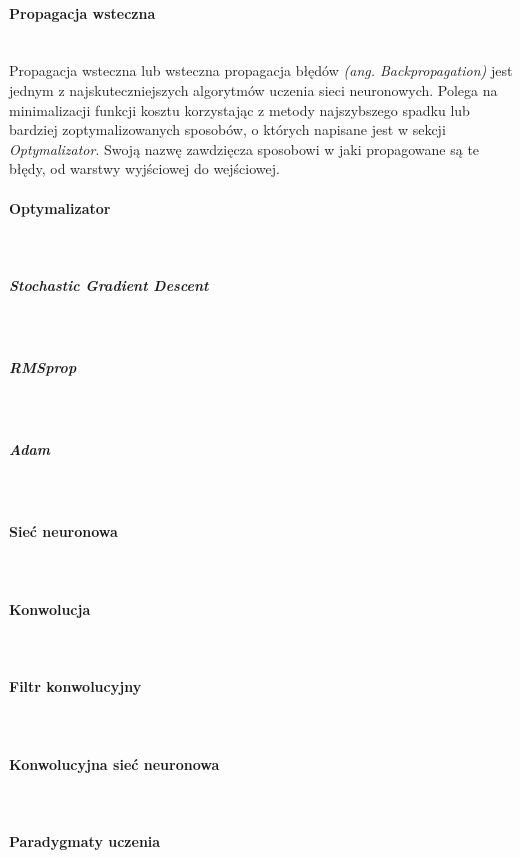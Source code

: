 \paragraph{Propagacja wsteczna} \mbox{}\\
Propagacja wsteczna lub wsteczna propagacja błędów \textit{(ang. Backpropagation)}
jest jednym z najskuteczniejszych algorytmów uczenia sieci neuronowych. Polega
na minimalizacji funkcji kosztu korzystając z metody najszybszego spadku lub
bardziej zoptymalizowanych sposobów, o których napisane jest w sekcji \textit{Optymalizator}.
Swoją nazwę zawdzięcza sposobowi w jaki propagowane są te błędy, od warstwy
wyjściowej do wejściowej.

\paragraph{Optymalizator} \mbox{}\\

\subparagraph{Stochastic Gradient Descent} \mbox{}\\

\subparagraph{RMSprop} \mbox{}\\

\subparagraph{Adam} \mbox{}\\

\paragraph{Sieć neuronowa} \mbox{}\\

\paragraph{Konwolucja} \mbox{}\\

\paragraph{Filtr konwolucyjny} \mbox{}\\

\paragraph{Konwolucyjna sieć neuronowa} \mbox{}\\

\paragraph{Paradygmaty uczenia} \mbox{}\\

